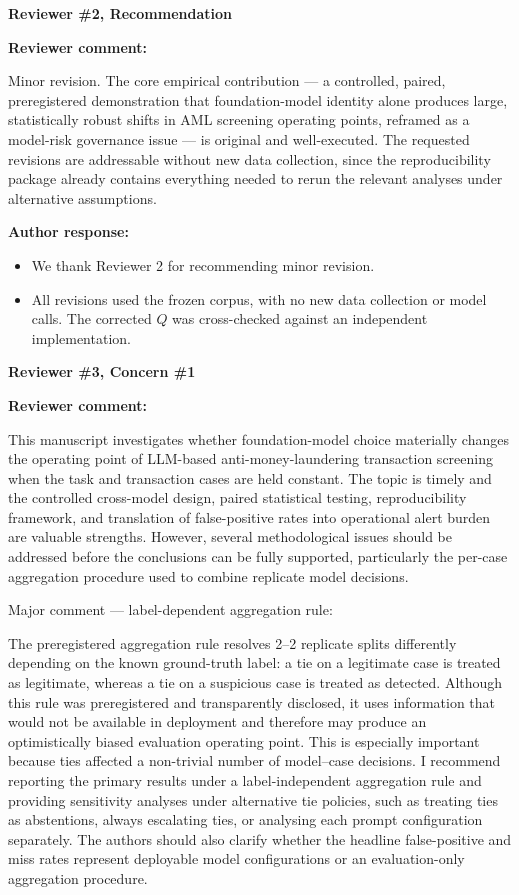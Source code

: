 \documentclass[11pt]{article}
\newcommand{\rvcomment}[1]{{\color{ReviewerGreen}#1}}
\newcommand{\concern}[1]{\textbf{\color{ReviewerGreen}#1}}
\begin{document}
\vspace{12pt}
\concern{Reviewer \#2, Recommendation}

\concern{Reviewer comment:}

\rvcomment{Minor revision. The core empirical contribution --- a controlled, paired, preregistered demonstration that foundation-model identity alone produces large, statistically robust shifts in AML screening operating points, reframed as a model-risk governance issue --- is original and well-executed. The requested revisions are addressable without new data collection, since the reproducibility package already contains everything needed to rerun the relevant analyses under alternative assumptions.}

\textbf{Author response:}

\begin{itemize}

\item We thank Reviewer 2 for recommending minor revision.

\item All revisions used the frozen corpus, with no new data collection or model calls. The corrected $Q$ was cross-checked against an independent implementation.

\end{itemize}

\vspace{12pt}
\concern{Reviewer \#3, Concern \#1}

\concern{Reviewer comment:}

\rvcomment{This manuscript investigates whether foundation-model choice materially changes the operating point of LLM-based anti-money-laundering transaction screening when the task and transaction cases are held constant. The topic is timely and the controlled cross-model design, paired statistical testing, reproducibility framework, and translation of false-positive rates into operational alert burden are valuable strengths. However, several methodological issues should be addressed before the conclusions can be fully supported, particularly the per-case aggregation procedure used to combine replicate model decisions.}

\rvcomment{Major comment --- label-dependent aggregation rule:}

\rvcomment{The preregistered aggregation rule resolves 2--2 replicate splits differently depending on the known ground-truth label: a tie on a legitimate case is treated as legitimate, whereas a tie on a suspicious case is treated as detected. Although this rule was preregistered and transparently disclosed, it uses information that would not be available in deployment and therefore may produce an optimistically biased evaluation operating point. This is especially important because ties affected a non-trivial number of model--case decisions. I recommend reporting the primary results under a label-independent aggregation rule and providing sensitivity analyses under alternative tie policies, such as treating ties as abstentions, always escalating ties, or analysing each prompt configuration separately. The authors should also clarify whether the headline false-positive and miss rates represent deployable model configurations or an evaluation-only aggregation procedure.}
\end{document}
